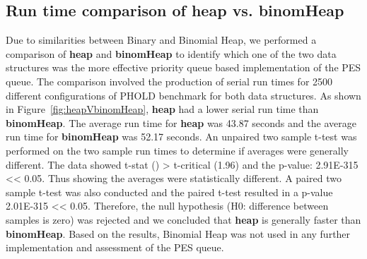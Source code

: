\subsection{Run time comparison of heap vs. binomHeap}
Due to similarities between Binary and Binomial Heap, we performed a comparison of \textbf{heap} and \textbf{binomHeap} to identify which one of the two data structures was the more effective priority queue based implementation of the PES queue. The comparison involved the production of serial run times for 2500 different configurations of PHOLD benchmark for both data structures. As shown in Figure~\ref{fig:heapVbinomHeap}, \textbf{heap} had a lower serial run time than \textbf{binomHeap}. The average run time for \textbf{heap} was 43.87 seconds and the average run time for \textbf{binomHeap} was 52.17 seconds. An unpaired two sample t-test was performed on the two sample run times to determine if averages were generally different. The data showed t-stat () > t-critical (1.96) and the p-value: 2.91E-315 << 0.05. Thus showing the averages were statistically different. A paired two sample t-test was also conducted and the paired t-test resulted in a p-value 2.01E-315
<< 0.05. Therefore, the null hypothesis (H0: difference between samples is zero) was rejected and we concluded that \textbf{heap} is generally faster than \textbf{binomHeap}. Based on the results, Binomial Heap was not used in any further implementation and assessment of the PES queue. 

